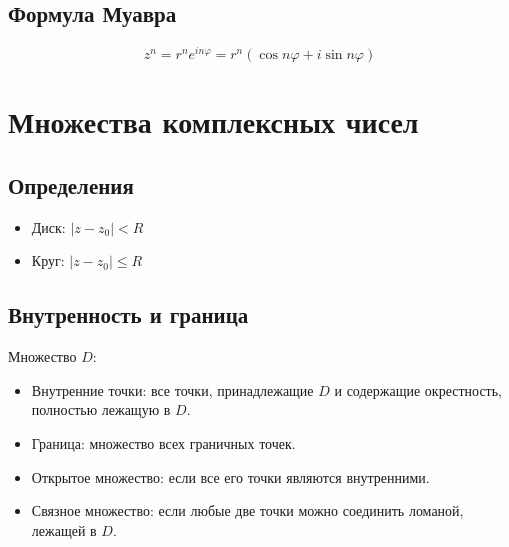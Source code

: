 \documentclass{article}
\begin{document}
\subsection{Формула Муавра}
\[
z^n = r^n e^{i n \varphi} = r^n (\cos n \varphi + i \sin n \varphi)
\]

\section{Множества комплексных чисел}

\subsection{Определения}
\begin{itemize}
    \item Диск: \( |z - z_0| < R \)
    \item Круг: \( |z - z_0| \leq R \)
\end{itemize}

\subsection{Внутренность и граница}
Множество $D$:
\begin{itemize}
    \item Внутренние точки: все точки, принадлежащие $D$ и содержащие окрестность, полностью лежащую в $D$.
    \item Граница: множество всех граничных точек.
    \item Открытое множество: если все его точки являются внутренними.
    \item Связное множество: если любые две точки можно соединить ломаной, лежащей в $D$.
\end{itemize}
\end{document}
